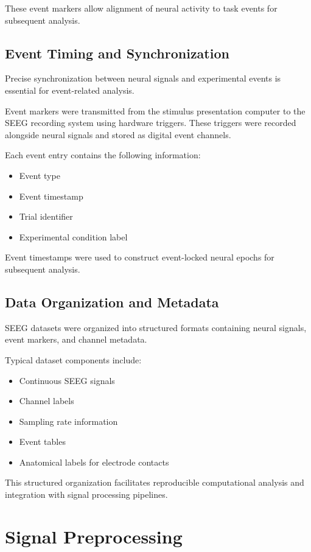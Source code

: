 \documentclass[11pt]{report}
\begin{document}
These event markers allow alignment of neural activity to task
events for subsequent analysis.

\section{Event Timing and Synchronization}

Precise synchronization between neural signals and experimental
events is essential for event-related analysis.

Event markers were transmitted from the stimulus presentation
computer to the SEEG recording system using hardware triggers.
These triggers were recorded alongside neural signals and stored
as digital event channels.

Each event entry contains the following information:

\begin{itemize}
\item Event type
\item Event timestamp
\item Trial identifier
\item Experimental condition label
\end{itemize}

Event timestamps were used to construct event-locked neural epochs
for subsequent analysis.

\section{Data Organization and Metadata}

SEEG datasets were organized into structured formats containing
neural signals, event markers, and channel metadata.

Typical dataset components include:

\begin{itemize}
\item Continuous SEEG signals
\item Channel labels
\item Sampling rate information
\item Event tables
\item Anatomical labels for electrode contacts
\end{itemize}

This structured organization facilitates reproducible computational
analysis and integration with signal processing pipelines.


\chapter{Signal Preprocessing}
\end{document}
